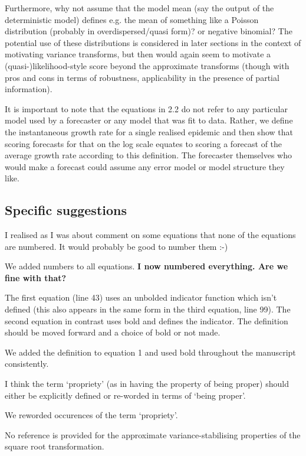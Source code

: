 \documentclass{article}
\newcommand{\red}{\color{red}}
\newcommand{\black}{\color{black}}
\newcommand{\blue}{\color{blue}}
\begin{document}
Furthermore, why not assume that the model mean (say the output of the deterministic model) defines e.g. the mean of something like a Poisson distribution (probably in overdispersed/quasi form)? or negative binomial? The potential use of these distributions is considered in later sections in the context of motivating variance transforms, but then would again seem to motivate a (quasi-)likelihood-style score beyond the approximate transforms (though with pros and cons in terms of robustness, applicability in the presence of partial information).

\black
It is important to note that the equations in 2.2 do not refer to any particular model used by a forecaster or any model that was fit to data. Rather, we define the instantaneous growth rate for a single realised epidemic and then show that scoring forecasts for that on the log scale equates to scoring a forecast of the average growth rate according to this definition. The forecaster themselves who would make a forecast could assume any error model or model structure they like. 

\blue
\subsection{Specific suggestions}

I realised as I was about comment on some equations that none of the equations are numbered. It would probably be good to number them :-)

\black
We added numbers to all equations. 
\textbf{I now numbered everything. Are we fine with that?}

\blue
The first equation (line 43) uses an unbolded indicator function which isn’t defined (this also appears in the same form in the third equation, line 99). The second equation in contrast uses bold and defines the indicator. The definition should be moved forward and a choice of bold or not made.

\black
We added the definition to equation 1 and used bold throughout the manuscript consistently. 

\blue
I think the term ‘propriety’ (as in having the property of being proper) should either be explicitly defined or re-worded in terms of ‘being proper’.

\black
We reworded occurences of the term `propriety'. 

\red
No reference is provided for the approximate variance-stabilising properties of the square root transformation.
\end{document}
